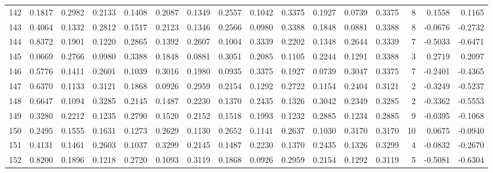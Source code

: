 \begin{tabular}{lrrrrrrrrrrrrrrr}
142 &      0.1817 &  0.2982 &  0.2133 &  0.1408 &  0.2087 &  0.1349 &  0.2557 &  0.1042 &  0.3375 &  0.1927 &   0.0739 &     0.3375 &      8 &                    0.1558 &                     0.1165 \\
143 &      0.4064 &  0.1332 &  0.2812 &  0.1517 &  0.2123 &  0.1346 &  0.2566 &  0.0980 &  0.3388 &  0.1848 &   0.0881 &     0.3388 &      8 &                   -0.0676 &                    -0.2732 \\
144 &      0.8372 &  0.1901 &  0.1220 &  0.2865 &  0.1392 &  0.2607 &  0.1004 &  0.3339 &  0.2202 &  0.1348 &   0.2644 &     0.3339 &      7 &                   -0.5033 &                    -0.6471 \\
145 &      0.0669 &  0.2766 &  0.0980 &  0.3388 &  0.1848 &  0.0881 &  0.3051 &  0.2085 &  0.1105 &  0.2244 &   0.1291 &     0.3388 &      3 &                    0.2719 &                     0.2097 \\
146 &      0.5776 &  0.1411 &  0.2601 &  0.1039 &  0.3016 &  0.1980 &  0.0935 &  0.3375 &  0.1927 &  0.0739 &   0.3047 &     0.3375 &      7 &                   -0.2401 &                    -0.4365 \\
147 &      0.6370 &  0.1133 &  0.3121 &  0.1868 &  0.0926 &  0.2959 &  0.2154 &  0.1292 &  0.2722 &  0.1154 &   0.2404 &     0.3121 &      2 &                   -0.3249 &                    -0.5237 \\
148 &      0.6647 &  0.1094 &  0.3285 &  0.2145 &  0.1487 &  0.2230 &  0.1370 &  0.2435 &  0.1326 &  0.3042 &   0.2349 &     0.3285 &      2 &                   -0.3362 &                    -0.5553 \\
149 &      0.3280 &  0.2212 &  0.1235 &  0.2790 &  0.1520 &  0.2152 &  0.1518 &  0.1993 &  0.1232 &  0.2885 &   0.1234 &     0.2885 &      9 &                   -0.0395 &                    -0.1068 \\
150 &      0.2495 &  0.1555 &  0.1631 &  0.1273 &  0.2629 &  0.1130 &  0.2652 &  0.1141 &  0.2637 &  0.1030 &   0.3170 &     0.3170 &     10 &                    0.0675 &                    -0.0940 \\
151 &      0.4131 &  0.1461 &  0.2603 &  0.1037 &  0.3299 &  0.2145 &  0.1487 &  0.2230 &  0.1370 &  0.2435 &   0.1326 &     0.3299 &      4 &                   -0.0832 &                    -0.2670 \\
152 &      0.8200 &  0.1896 &  0.1218 &  0.2720 &  0.1093 &  0.3119 &  0.1868 &  0.0926 &  0.2959 &  0.2154 &   0.1292 &     0.3119 &      5 &                   -0.5081 &                    -0.6304 \\

\end{tabular}
